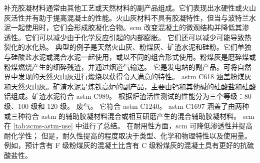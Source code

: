 补充胶凝材料通常由其他工艺或天然材料的副产品组成。它们表现出水硬性或火山灰活性并有助于提高混凝土的性能。火山灰材料不具有胶凝特性，但当与波特兰水泥一起使用时，它们会形成胶凝化合物。\gls*{scm} 改变混凝土的微观结构并降低其渗透性。它们可以减少由于化学反应引起的内部膨胀。 它们还可以减少可能导致热裂化的水化热。 典型的例子是天然火山灰、粉煤灰、矿渣水泥和硅粉。它们单独与硅酸盐水泥或混合水泥一起使用，或以不同的组合形式使用。粉煤灰是磨碎煤或粉煤燃烧产生的细碎残渣，并通过烟道气输送。 它是发电站的副产品。可将自然界中发现的天然火山灰进行煅烧以获得令人满意的特性。 \acrshort*{astm} C618 涵盖粉煤灰和天然火山灰。矿渣水泥是炼铁高炉的副产品，主要由钙和其他碱的硅酸盐和硅酸铝组成。矿渣水泥符合 \acrshort*{astm} C989。 根据炉渣活性测试的性能分为三个等级：80 级、100 级和 120 级。 废气。 它符合 \acrshort*{astm} C1240。 \acrshort*{astm} C1697 涵盖了由两种或三种符合 \acrshort*{astm} 的辅助胶凝材料混合或相互研磨产生的混合辅助胶凝材料。 \gls*{scm} 在 \cref{tab:scms-astm-use} 中进行了总结。 在耐用性方面，\gls*{scm} 可降低渗透性并提高耐化学性； 但是，耐久性提高的程度取决于类型、化学和物理特性以及使用量。 例如，预计含有 F 级粉煤灰的混凝土比含有 C 级粉煤灰的混凝土具有更好的抗硫酸盐性。

